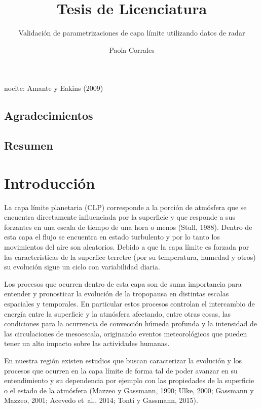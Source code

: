 \documentclass[12pt,spanish,oneside]{book}
\title{Tesis de Licenciatura}
\subtitle{Validación de parametrizaciones de capa límite utilizando datos de radar}
\author{Paola Corrales}
\date{}
\begin{document}
\maketitle

{
\setcounter{tocdepth}{3}
\tableofcontents
}
nocite: \textbar{} Amante y Eakins (2009)

\renewcommand{\listtablename}{Índice de tablas} 
\renewcommand{\tablename}{Tabla} 

\listoffigures
\newpage

\listoftables
\newpage

\section*{Agradecimientos}\newpage

\section*{Resumen}\newpage

\chapter{Introducción}\label{introduccion}

La capa límite planetaria (CLP) corresponde a la porción de atmósfera
que se encuentra directamente influenciada por la superficie y que
responde a sus forzantes en una escala de tiempo de una hora o menos
(Stull, 1988). Dentro de esta capa el flujo se encuentra en estado
turbulento y por lo tanto los movimientos del aire son aleatorios.
Debido a que la capa límite es forzada por las características de la
superfice terretre (por su temperatura, humedad y otros) su evolución
sigue un ciclo con variabilidad diaria.

Los procesos que ocurren dentro de esta capa son de suma importancia
para entender y pronosticar la evolución de la tropopausa en distintas
escalas espaciales y temporales. En particular estos procesos controlan
el intercambio de energía entre la superficie y la atmósfera afectando,
entre otras cosas, las condiciones para la ocurrencia de convección
húmeda profunda y la intensidad de las circulaciones de mesoescala,
originando eventos meteorológicos que pueden tener un alto impacto sobre
las actividades humanas.

En nuestra región existen estudios que buscan caracterizar la evolución
y los procesos que ocurren en la capa límite de forma tal de poder
avanzar en su entendimiento y su dependencia por ejemplo con las
propiedades de la superficie o el estado de la atmósfera (Mazzeo y
Gassmann, 1990; Ulke, 2000; Gassmann y Mazzeo, 2001; Acevedo et~al.,
2014; Tonti y Gassmann, 2015).
\end{document}
